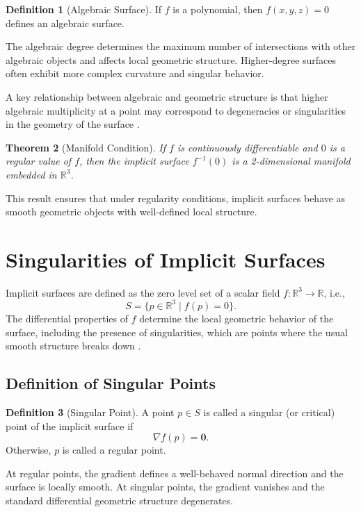 \documentclass[12pt, a4paper, oneside]{book}
\theoremstyle{plain}
\newtheorem{theorem}{Theorem}[chapter]
\theoremstyle{definition}
\newtheorem{definition}[theorem]{Definition}
\theoremstyle{remark}
\theoremstyle{definition}
\begin{document}
\begin{definition}[Algebraic Surface]
If $f$ is a polynomial, then $f(x,y,z)=0$ defines an algebraic surface.
\end{definition}

The algebraic degree determines the maximum number of intersections with other algebraic objects and affects local geometric structure. Higher-degree surfaces often exhibit more complex curvature and singular behavior.

A key relationship between algebraic and geometric structure is that higher algebraic multiplicity at a point may correspond to degeneracies or singularities in the geometry of the surface \cite{bloomenthal2000implicit}.

\begin{theorem}[Manifold Condition]
If $f$ is continuously differentiable and $0$ is a regular value of $f$, then the implicit surface $f^{-1}(0)$ is a 2-dimensional manifold embedded in $\mathbb{R}^3$.
\end{theorem}

This result ensures that under regularity conditions, implicit surfaces behave as smooth geometric objects with well-defined local structure.

\section{Singularities of Implicit Surfaces}

Implicit surfaces are defined as the zero level set of a scalar field $f:\mathbb{R}^3 \rightarrow \mathbb{R}$, i.e.,
\[
S = \{ p \in \mathbb{R}^3 \mid f(p) = 0 \}.
\]
The differential properties of $f$ determine the local geometric behavior of the surface, including the presence of singularities, which are points where the usual smooth structure breaks down \cite{bloomenthal2000implicit}.

\subsection{Definition of Singular Points}

\begin{definition}[Singular Point]
A point $p \in S$ is called a singular (or critical) point of the implicit surface if
\[
\nabla f(p) = \mathbf{0}.
\]
Otherwise, $p$ is called a regular point.
\end{definition}

At regular points, the gradient defines a well-behaved normal direction and the surface is locally smooth. At singular points, the gradient vanishes and the standard differential geometric structure degenerates.
\end{document}
